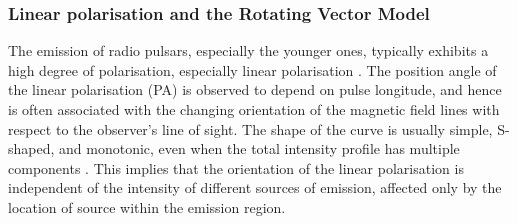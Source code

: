 \subsubsection*{Linear polarisation and the Rotating Vector Model}
\label{sec: intro - emission models - polarisation - RVM}

The emission of radio pulsars, especially the younger ones, typically exhibits a high degree of polarisation, especially linear polarisation \citep[e.g.][]{QMLG1995, CMKx2001}. The position angle of the linear polarisation (PA) is observed to depend on pulse longitude, and hence is often associated with the changing orientation of the magnetic field lines with respect to the observer's line of sight.  The shape of the curve is usually simple, S-shaped, and monotonic, even when the total intensity profile has multiple components \citep{WCL+1999}. This implies that the orientation of the linear polarisation is independent of the intensity of different sources of emission, affected only by the location of source within the emission region.


